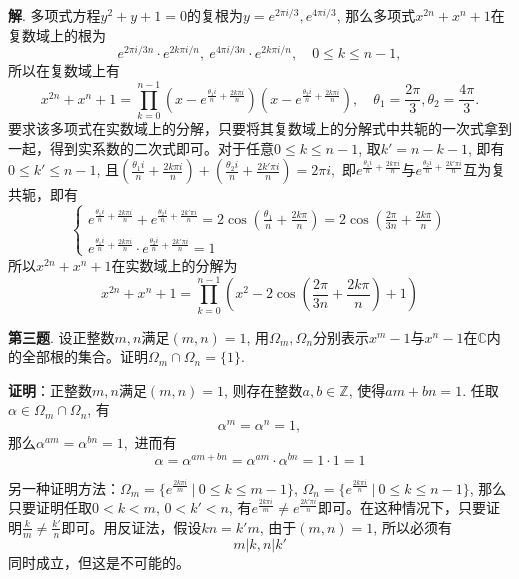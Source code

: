 {\bf 解}. 多项式方程$y^2 + y + 1 = 0$的复根为$y = e^{2\pi i/3}, e^{4\pi i/3}$, 那么多项式$x^{2n} + x^n + 1$在复数域上的根为
$$e^{2\pi i/3n} \cdot e^{2k\pi i/n},\ e^{4\pi i/3n} \cdot e^{2k\pi i/n}, \quad 0 \leqslant k \leqslant n-1,$$
所以在复数域上有
$$x^{2n} + x^n + 1 = \prod_{k=0}^{n-1} \left(x - e^{\frac{\theta_1 i}{n} + \frac{2k\pi i}{n}}\right) \left(x - e^{\frac{\theta_2 i}{n} + \frac{2k\pi i}{n}}\right), \quad \theta_1 = \frac{2\pi}{3}, \theta_2 = \frac{4\pi}{3}.$$
要求该多项式在实数域上的分解，只要将其复数域上的分解式中共轭的一次式拿到一起，得到实系数的二次式即可。对于任意$0\leqslant k \leqslant n-1$, 取$k' = n-k-1$, 即有$0\leqslant k' \leqslant n-1$, 且$(\frac{\theta_1 i}{n} + \frac{2k\pi i}{n}) + (\frac{\theta_2 i}{n} + \frac{2k'\pi i}{n}) = 2\pi i,$ 即$e^{\frac{\theta_1 i}{n} + \frac{2k\pi i}{n}}$与$e^{\frac{\theta_2 i}{n} + \frac{2k'\pi i}{n}}$互为复共轭，即有
$$
\begin{cases}
e^{\frac{\theta_1 i}{n} + \frac{2k\pi i}{n}} + e^{\frac{\theta_2 i}{n} + \frac{2k'\pi i}{n}} = 2 \cos \left( \frac{\theta_1}{n} + \frac{2k\pi}{n} \right) = 2 \cos \left( \frac{2\pi}{3n} + \frac{2k\pi}{n} \right) \\
e^{\frac{\theta_1 i}{n} + \frac{2k\pi i}{n}} \cdot e^{\frac{\theta_2 i}{n} + \frac{2k'\pi i}{n}} = 1
\end{cases}
$$
所以$x^{2n} + x^n + 1$在实数域上的分解为
$$x^{2n} + x^n + 1 = \prod_{k=0}^{n-1} \left( x^2 - 2 \cos \left( \frac{2\pi}{3n} + \frac{2k\pi}{n} \right) + 1 \right)$$

\newpageorvspace


{\bf 第三题}. 设正整数$m,n$满足$(m,n)=1$, 用$\Omega_m, \Omega_n$分别表示$x^m-1$与$x^n-1$在$\mathbb{C}$内的全部根的集合。证明$\Omega_m \cap \Omega_n = \{1\}$.

{\bf 证明}：正整数$m,n$满足$(m,n)=1$, 则存在整数$a,b\in\mathbb{Z}$, 使得$am+bn=1$. 任取$\alpha\in \Omega_m \cap \Omega_n$, 有
$$\alpha^m = \alpha^n = 1,$$
那么$\alpha^{am} = \alpha^{bn} = 1,$ 进而有
$$\alpha = \alpha^{am+bn} = \alpha^{am} \cdot \alpha^{bn} = 1 \cdot 1 = 1$$

另一种证明方法：$\Omega_m = \{ e^{\frac{2k\pi i}{m}} \ |\ 0\leqslant k \leqslant m-1 \}$, $\Omega_n = \{ e^{\frac{2k\pi i}{n}} \ |\ 0\leqslant k \leqslant n-1 \}$, 那么只要证明任取$0 < k < m$, $0 < k' < n$, 有$e^{\frac{2k\pi i}{m}} \neq e^{\frac{2k'\pi i}{n}}$即可。在这种情况下，只要证明$\frac{k}{m} \neq \frac{k'}{n}$即可。用反证法，假设$kn=k'm$, 由于$(m,n)=1$, 所以必须有
$$m|k, n|k'$$
同时成立，但这是不可能的。


\newpageorvspace


